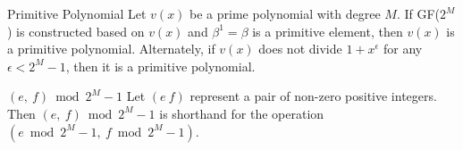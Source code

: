 \begin{definition}{Primitive Polynomial \newline}
Let $v(x)$ be a prime polynomial with degree $M$. If GF($2^M$) is constructed based on $v(x)$ and $\beta^1 = \beta$ is a primitive element, then $v(x)$ is a primitive polynomial. Alternately, if $v(x)$ does not divide $1+x^{\epsilon}$ for any $\epsilon<2^M-1$, then it is a primitive polynomial. 
\end{definition}

\begin{definition}{ $(e,~f) \bmod 2^M-1$ \newline}
Let $(e~f)$ represent a pair of non-zero positive integers. Then $(e,~f) \bmod 2^M-1$ is shorthand for the operation $(e \bmod 2^M-1,~f \bmod 2^M-1)$.
\end{definition}








